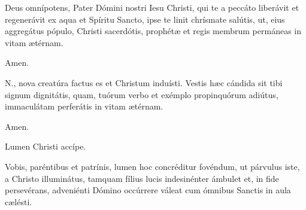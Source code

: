 
Deus omnípotens, Pater Dómini nostri Iesu Christi, qui te a peccáto liberávit et regenerávit ex aqua et
Spíritu Sancto, ipse te linit chrísmate salútis, ut, eius aggregátus pópulo, Christi sacerdótis,
prophétæ et regis membrum permáneas in vitam ætérnam.

 Amen.



 {\color{red}N.}, nova creatúra factus es et Christum induísti.
Vestis hæc cándida sit tibi signum dignitátis, quam, tuórum verbo et exémplo propinquórum adiútus,
immaculátam perferátis in vitam ætérnam.

 Amen.



 Lumen Christi accípe.


 Vobis, paréntibus et patrínis, lumen hoc concréditur fovéndum,
ut párvulus iste, a Christo illuminátus, tamquam fílius lucis indesinénter ámbulet et,
in fide persevérans, adveniénti Dómino occúrrere váleat cum ómnibus Sanctis in aula
cælésti.


